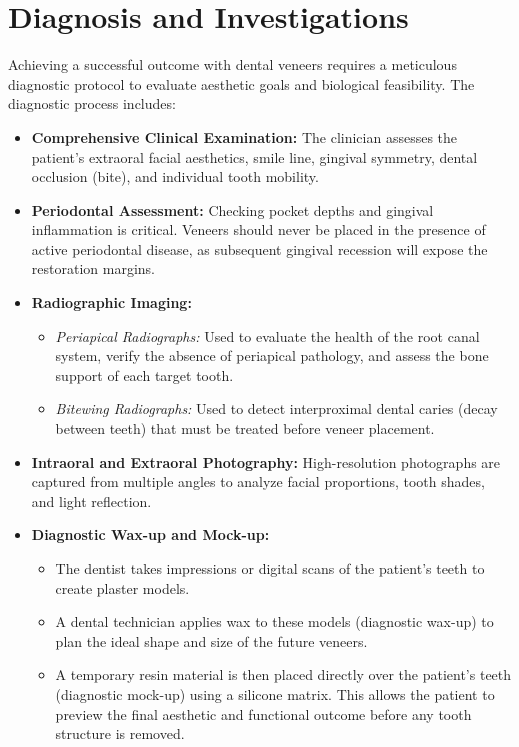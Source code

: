 \section*{Diagnosis and Investigations}
Achieving a successful outcome with dental veneers requires a meticulous diagnostic protocol to evaluate aesthetic goals and biological feasibility. The diagnostic process includes:
\begin{itemize}
    \item \textbf{Comprehensive Clinical Examination:} The clinician assesses the patient's extraoral facial aesthetics, smile line, gingival symmetry, dental occlusion (bite), and individual tooth mobility.
    \item \textbf{Periodontal Assessment:} Checking pocket depths and gingival inflammation is critical. Veneers should never be placed in the presence of active periodontal disease, as subsequent gingival recession will expose the restoration margins.
    \item \textbf{Radiographic Imaging:}
    \begin{itemize}
        \item \textit{Periapical Radiographs:} Used to evaluate the health of the root canal system, verify the absence of periapical pathology, and assess the bone support of each target tooth.
        \item \textit{Bitewing Radiographs:} Used to detect interproximal dental caries (decay between teeth) that must be treated before veneer placement.
    \end{itemize}
    \item \textbf{Intraoral and Extraoral Photography:} High-resolution photographs are captured from multiple angles to analyze facial proportions, tooth shades, and light reflection.
    \item \textbf{Diagnostic Wax-up and Mock-up:}
    \begin{itemize}
        \item The dentist takes impressions or digital scans of the patient's teeth to create plaster models.
        \item A dental technician applies wax to these models (diagnostic wax-up) to plan the ideal shape and size of the future veneers.
        \item A temporary resin material is then placed directly over the patient's teeth (diagnostic mock-up) using a silicone matrix. This allows the patient to preview the final aesthetic and functional outcome before any tooth structure is removed.
    \end{itemize}
\end{itemize}

